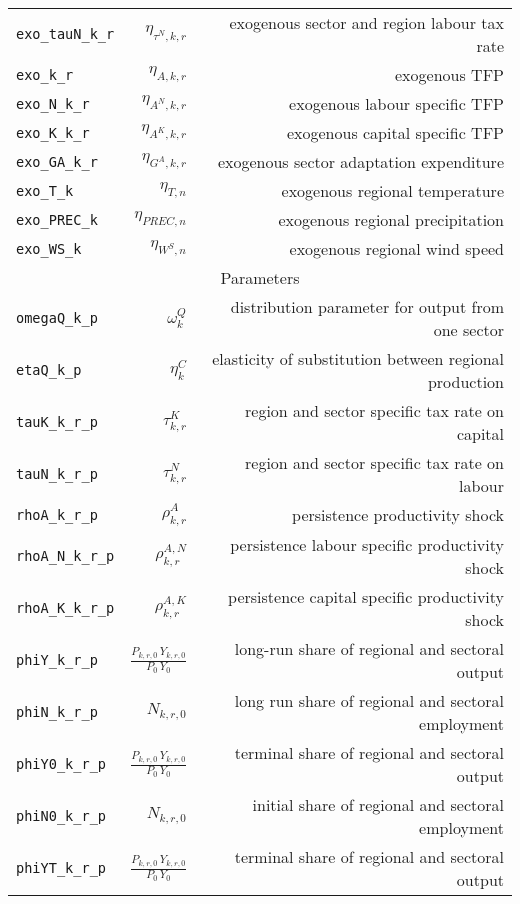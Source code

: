 \begin{center}
\begin{longtable}{lrr}
\texttt{exo\_tauN\_k\_r} & ${\eta_{\tau^{N},k,r}}$ & exogenous sector and region labour tax rate\\
\texttt{exo\_k\_r} & ${\eta_{A,k,r}}$ & exogenous TFP\\
\texttt{exo\_N\_k\_r} & ${\eta_{A^{N},k,r}}$ & exogenous labour specific TFP\\
\texttt{exo\_K\_k\_r} & ${\eta_{A^{K},k,r}}$ & exogenous capital specific TFP\\
\texttt{exo\_GA\_k\_r} & ${\eta_{G^{A},k,r}}$ & exogenous sector adaptation expenditure\\
\texttt{exo\_T\_k} & ${\eta_{T,n}}$ & exogenous regional temperature\\
\texttt{exo\_PREC\_k} & ${\eta_{PREC,n}}$ & exogenous regional precipitation\\
\texttt{exo\_WS\_k} & ${\eta_{W^{S},n}}$ & exogenous regional wind speed\\
\hline%
\multicolumn{3}{c}{Parameters}\\%
\hline%
\texttt{omegaQ\_k\_p} & ${\omega^{Q}_{k}}$ & distribution parameter for output from one sector\\
\texttt{etaQ\_k\_p} & ${\eta^{C}_{k}}$ & elasticity of substitution between regional production\\
\texttt{tauK\_k\_r\_p} & ${\tau^{K}_{k,r}}$ & region and sector specific tax rate on capital\\
\texttt{tauN\_k\_r\_p} & ${\tau^{N}_{k,r}}$ & region and sector specific tax rate on labour\\
\texttt{rhoA\_k\_r\_p} & ${\rho^{A}_{k,r}}$ & persistence productivity shock\\
\texttt{rhoA\_N\_k\_r\_p} & ${\rho^{A,N}_{k,r}}$ & persistence labour specific productivity shock\\
\texttt{rhoA\_K\_k\_r\_p} & ${\rho^{A,K}_{k,r}}$ & persistence capital specific productivity shock\\
\texttt{phiY\_k\_r\_p} & $\frac{P_{k,r,0} \, Y_{k,r,0}}{P_{0} \, Y_{0}}$ & long-run share of regional and sectoral output\\
\texttt{phiN\_k\_r\_p} & ${N_{k,r,0}}$ & long run share of regional and sectoral employment\\
\texttt{phiY0\_k\_r\_p} & $\frac{P_{k,r,0} \, Y_{k,r,0}}{P_{0} \, Y_{0}}$ & terminal share of regional and sectoral output\\
\texttt{phiN0\_k\_r\_p} & ${N_{k,r,0}}$ & initial share of regional and sectoral employment\\
\texttt{phiYT\_k\_r\_p} & $\frac{P_{k,r,0} \, Y_{k,r,0}}{P_{0} \, Y_{0}}$ & terminal share of regional and sectoral output\\

\end{longtable}
\end{center}
